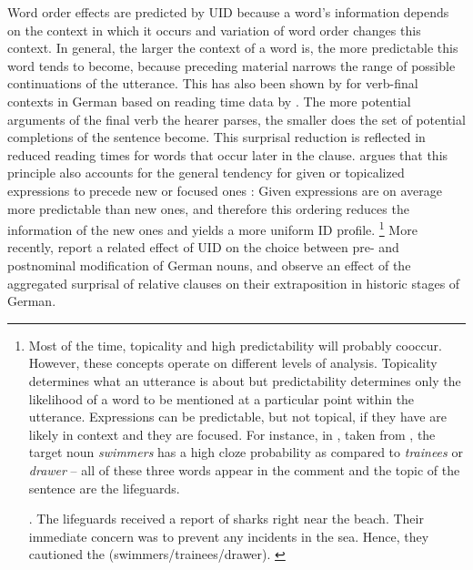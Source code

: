 Word order effects are predicted by UID because a word's information depends on the context in which it occurs and variation of word order changes this context. In general, the larger the context of a word is, the more predictable this word tends to become, because preceding material narrows the range of possible continuations of the utterance. This has also been shown by \citet{levy2008} for verb-final contexts in German based on reading time data by \citet{konieczny.doring2003}. The more potential arguments of the final verb the hearer parses, the smaller does the set of potential completions of the sentence become. This surprisal reduction is reflected in reduced reading times for words that occur later in the clause. \citet{fenk-oczlon1983} argues that this principle also accounts for the general tendency for given or topicalized expressions to precede new or focused ones \citep{chafe1976}: Given expressions are on average more predictable than new ones, and therefore this ordering reduces the information of the new ones and yields a more uniform ID profile.%
%
\footnote{Most of the time, topicality and high predictability will probably cooccur. However, these concepts operate on different levels of analysis. Topicality determines what an utterance is about \citep{reinhart1981, krifka2007} but predictability determines only the likelihood of a word to be mentioned at a particular point within the utterance. Expressions can be predictable, but not topical, if they have are likely in context and they are focused. For instance, in \Next, taken from \citet{kuperberg.etal2020}, the target noun \textit{swimmers} has a high cloze probability as compared to \textit{trainees} or \textit{drawer} -- all of these three words appear in the comment and the topic of the sentence are the lifeguards.

\ex. The lifeguards received a report of sharks right near the beach. Their immediate concern was to prevent any incidents in the sea.  Hence, they cautioned the (swimmers/trainees/drawer). \hfill \citep{kuperberg.etal2020}

}\afterfn%
% 
More recently, \citet{sikos.etal2017} report a related effect of UID on the choice between pre- and postnominal modification of German nouns, and \citet{speyer.lemke2017} observe an effect of the aggregated surprisal of relative clauses on their extraposition in historic stages of German.

